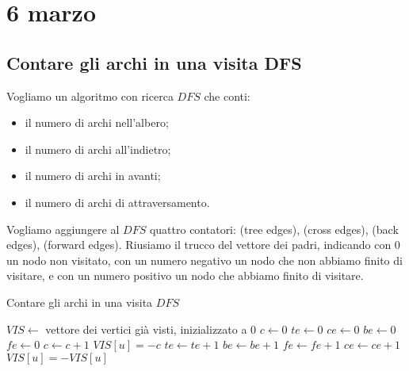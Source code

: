 \section{6 marzo}

\subsection{Contare gli archi in una visita DFS}

\begin{esercizio}
Vogliamo un algoritmo con ricerca $DFS$ che conti:
\begin{itemize}
    \item il numero di archi nell'albero;
    \item il numero di archi all'indietro;
    \item il numero di archi in avanti;
    \item il numero di archi di attraversamento.
\end{itemize}
\end{esercizio}

Vogliamo aggiungere al $DFS$ quattro contatori:  (tree edges),  (cross edges),  (back edges),  (forward edges). Riusiamo il trucco del vettore dei padri, indicando con 0 un nodo non visitato, con un numero negativo un nodo che non abbiamo finito di visitare, e con un numero positivo un nodo che abbiamo finito di visitare.

\begin{algorithm}
\caption{Contare gli archi in una visita $DFS$}
\begin{algorithmic}[1]
\State $VIS \gets$ vettore dei vertici gi\`a visti, inizializzato a 0
\State $c \gets 0$
\State $te \gets 0$
\State $ce \gets 0$
\State $be \gets 0$
\State $fe \gets 0$
    \State $c \gets c + 1$
    \State $VIS[u] = -c$
            \State $te \gets te + 1$
            \State {}
            \State $be \gets be + 1$
            \State $fe \gets fe + 1$
        \Else
            \State $ce \gets ce + 1$
        \EndIf
    \EndFor
    \State $VIS[u] = - VIS[u]$
\EndFunction
\end{algorithmic}
\end{algorithm}

